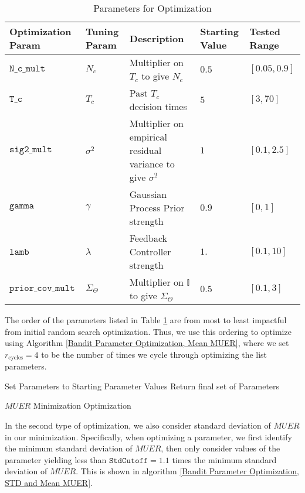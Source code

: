   \begin{table}[h!]
 \caption{Parameters for Optimization}
 \label{Parameter Optimization Table}
 \centering \begin{tabular*}
{0.987\textwidth}
{|p{}|p{}|p{}|p{}|p{}|}
\toprule
Optimization Param & Tuning Param & Description & Starting Value & Tested Range \\
\midrule
$\mathtt{N\_c\_mult}$ & $N_c$ & Multiplier on $T_c$ to give $N_c$ & $0.5$ & $[0.05,0.9]$ \\
$\mathtt{T\_c}$ & $T_c$ &  Past $T_c$ decision times& $5$ & $[3,70]$ \\
$\mathtt{sig2\_mult}$ & $\sigma^2$ & Multiplier on empirical residual variance to give $\sigma^2$ & $1$ & $[0.1,2.5]$ \\
$\mathtt{gamma}$ & $\gamma$ & Gaussian Process Prior strength & $0.9$ & $[0,1]$ \\
$\mathtt{lamb}$ & $\lambda$ & Feedback Controller strength & $1.$ & $[0.1,10]$ \\
$\mathtt{prior\_cov\_mult}$ & $\Sigma_\Theta$ & Multiplier on $\mathbb{I}$ to give $\Sigma_\Theta$ & $0.5$ & $[0.1,3]$
\\\bottomrule
\end{tabular*}
  \end{table}

The order of the parameters listed in Table \ref{Parameter Optimization Table} are from most to least impactful from initial random search optimization.  Thus, we use this ordering to optimize using Algorithm \ref{Bandit Parameter Optimization, Mean MUER}, where we set $r_{\text{cycles}} = 4$ to be the number of times we cycle through optimizing the list parameters.

\begin{algorithm}[h!]
 Set Parameters to Starting Parameter Values\;
  Return final set of Parameters\;
 \caption{$MUER$ Minimization Optimization}
 \label{Bandit Parameter Optimization, Mean MUER}
 \end{algorithm}


 In the second type of optimization, we also consider standard deviation of $MUER$ in our minimization.  Specifically, when optimizing a parameter, we first identify the minimum standard deviation of $MUER$, then only consider values of the parameter yielding less than $\mathtt{StdCutoff} = 1.1$ times the minimum standard deviation of $MUER$. This is shown in algorithm \ref{Bandit Parameter Optimization, STD and Mean MUER}. \\


